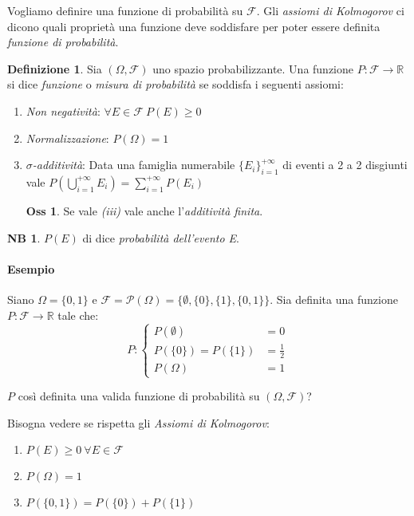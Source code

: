 \documentclass[12pt, a4paper]{report}
\theoremstyle{definition}
\newtheorem{definition}{Definizione}[section]
\newtheorem*{observation}{Oss}
\newtheorem*{note}{NB}
\DeclareRobustCommand{\F}{\mathcal{F}}%
\DeclareRobustCommand{\R}{\mathbb{R}}%
\DeclareRobustCommand{\powerset}{\mathcal{P}(\Omega)}
\begin{document}
\noindent
Vogliamo definire una funzione di probabilità su $\F$. Gli \emph{assiomi di
Kolmogorov}
ci dicono quali proprietà una funzione deve soddisfare per poter essere definita
\emph{funzione di probabilità}.
\begin{definition}
	Sia $(\Omega, \F)$ uno spazio probabilizzante. Una funzione \(P:\F
	\rightarrow\R\) si dice \emph{funzione} o \emph{misura di probabilità}
	se soddisfa i seguenti assiomi:
	\begin{enumerate}[label=(\roman*)]
		\item \emph{Non negatività}: \(\forall E\in\F\ P(E)\geq0\)
		\item \emph{Normalizzazione}: \(P(\Omega)=1\)
		\item \emph{$\sigma$-additività}: Data una famiglia numerabile 
		\(\{E_i\}_{i=1}^{+\infty}\) di eventi a 2 a 2 disgiunti vale \(P( 
		\bigcup_{i=1}^{+\infty}E_i) = \sum_{i=1}^{+\infty}P(E_i)\)
		\begin{observation}
			Se vale \emph{(iii)} vale anche l'\emph{additività finita}.
		\end{observation}
	\end{enumerate}
\end{definition}
\begin{note}
	$P(E)$ di dice \emph{probabilità dell'evento E}.
\end{note}

\paragraph*{Esempio}
Siano $\Omega=\{0, 1\}$ e \(\F=\powerset=\{\emptyset, \{0\}, \{1\}, \{0, 1\}\}\).
Sia definita una funzione\\ \(P:\F\rightarrow\R\) tale che:
\[P:\begin{cases}
	P(\emptyset) & = 0 \\
	P(\{0\}) = P(\{1\}) & = \frac{1}{2} \\
	P(\Omega) & = 1
\end{cases}\]

\noindent
$P$ così definita una valida funzione di probabilità su \((\Omega, \F)\)?

Bisogna vedere se rispetta gli \emph{Assiomi di Kolmogorov}:
\begin{enumerate}[label=(\roman*)]
	\item \(P(E)\geq 0\ \forall E\in\F\) \checkmark
	\item \(P(\Omega)=1\) \checkmark
	\item \(P(\{0, 1\}) = P(\{0\}) + P(\{1\})\) \checkmark
\end{enumerate}
\end{document}
